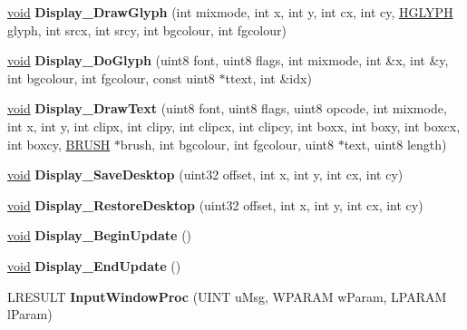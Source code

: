 \begin{DoxyCompactItemize}
\item 
\mbox{\label{class_rdp_client_u_i_a3586134bc02f1302a02f2e237c9241af}} 
\hyperlink{interfacevoid}{void} {\bfseries Display\+\_\+\+Draw\+Glyph} (int mixmode, int x, int y, int cx, int cy, \hyperlink{interfacevoid}{H\+G\+L\+Y\+PH} glyph, int srcx, int srcy, int bgcolour, int fgcolour)
\item 
\mbox{\label{class_rdp_client_u_i_a1557d45c3de0e2ba71056b153c63808e}} 
\hyperlink{interfacevoid}{void} {\bfseries Display\+\_\+\+Do\+Glyph} (uint8 font, uint8 flags, int mixmode, int \&x, int \&y, int bgcolour, int fgcolour, const uint8 $\ast$ttext, int \&idx)
\item 
\mbox{\label{class_rdp_client_u_i_a89a7393129a791760aad378de41dec09}} 
\hyperlink{interfacevoid}{void} {\bfseries Display\+\_\+\+Draw\+Text} (uint8 font, uint8 flags, uint8 opcode, int mixmode, int x, int y, int clipx, int clipy, int clipcx, int clipcy, int boxx, int boxy, int boxcx, int boxcy, \hyperlink{class_b_r_u_s_h}{B\+R\+U\+SH} $\ast$brush, int bgcolour, int fgcolour, uint8 $\ast$text, uint8 length)
\item 
\mbox{\label{class_rdp_client_u_i_a65b6c7991170d50d60d7e526864182a3}} 
\hyperlink{interfacevoid}{void} {\bfseries Display\+\_\+\+Save\+Desktop} (uint32 offset, int x, int y, int cx, int cy)
\item 
\mbox{\label{class_rdp_client_u_i_abee3806c359a0091d1927345d6ba369b}} 
\hyperlink{interfacevoid}{void} {\bfseries Display\+\_\+\+Restore\+Desktop} (uint32 offset, int x, int y, int cx, int cy)
\item 
\mbox{\label{class_rdp_client_u_i_a656764465a779938b0a58b6b8078bdaa}} 
\hyperlink{interfacevoid}{void} {\bfseries Display\+\_\+\+Begin\+Update} ()
\item 
\mbox{\label{class_rdp_client_u_i_ad2dfb2e004a6f4d29c7d750d5f7913e2}} 
\hyperlink{interfacevoid}{void} {\bfseries Display\+\_\+\+End\+Update} ()
\item 
\mbox{\label{class_rdp_client_u_i_a270ec440fc6dfda861b323fb212c24d2}} 
L\+R\+E\+S\+U\+LT {\bfseries Input\+Window\+Proc} (U\+I\+NT u\+Msg, W\+P\+A\+R\+AM w\+Param, L\+P\+A\+R\+AM l\+Param)
\end{DoxyCompactItemize}
